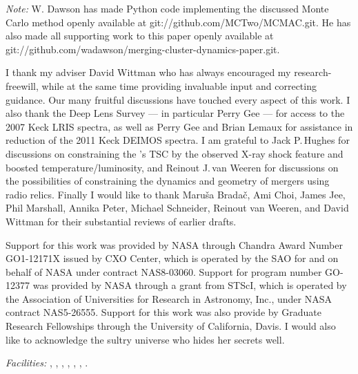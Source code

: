 

\emph{Note:} W. Dawson has made Python code implementing the discussed Monte Carlo method openly available at git://github.com/MCTwo/MCMAC.git.
He has also made all supporting work to this paper openly available at 
git://github.com/wadawson/merging-cluster-dynamics-paper.git.

\acknowledgments

I thank my adviser David Wittman who has always encouraged my research-freewill, while at the same time providing invaluable input and correcting guidance.
Our many fruitful discussions have touched every aspect of this work.
I also thank the Deep Lens Survey --- in particular Perry Gee --- for access to the 2007 Keck LRIS spectra, as well as Perry Gee and Brian Lemaux for assistance in reduction of the 2011 Keck DEIMOS spectra.  
I am grateful to  Jack P.\,Hughes for discussions on constraining the 's TSC by the observed X-ray shock feature and boosted temperature/luminosity, and
Reinout J.\,van Weeren for discussions on the possibilities of constraining the dynamics and geometry of mergers using radio relics.
Finally I would like to thank Maru{\v s}a Brada{\v c}, Ami Choi, James Jee, Phil Marshall, Annika Peter, Michael Schneider, Reinout van Weeren, and David Wittman for their substantial reviews of earlier drafts.

Support for this work was provided by NASA through Chandra Award Number GO1-12171X issued by CXO Center, which is operated by the SAO for and on behalf of NASA under contract NAS8-03060.  Support for program number GO-12377 was provided by NASA through a grant from STScI, which is operated by the Association of Universities for Research in Astronomy, Inc., under NASA contract NAS5-26555.
Support for this work was also provide by Graduate Research Fellowships through the University of California, Davis.
I would also like to acknowledge the sultry universe who hides her secrets well.


{\it Facilities:} , , , , , , .

